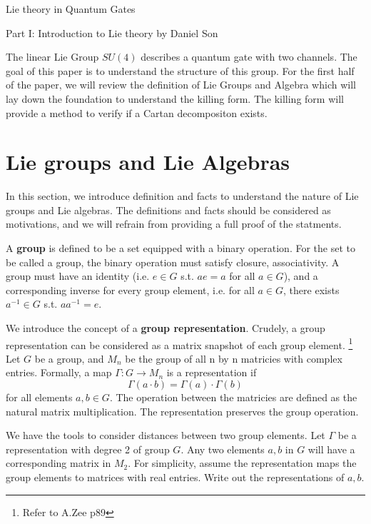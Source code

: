 \documentclass{article}
\begin{document}
\begin{center}
\LARGE
Lie theory in Quantum Gates

\Large
Part I: Introduction to Lie theory by Daniel Son
\end{center}

\normalsize

The linear Lie Group $SU(4)$ describes a quantum gate with two channels. 
The goal of this paper is to understand the structure of this group. 
For the first half of the paper, we will review the definition of Lie Groups 
and Algebra which will lay down the foundation to understand the killing form. 
The killing form will provide a method to verify if a Cartan decompositon 
exists. 

\section{Lie groups and Lie Algebras}


In this section, we introduce definition and facts to 
understand the nature of Lie groups and Lie algebras. 
The definitions and facts should be considered as motivations, 
and we will refrain from providing a full proof of the statments. 


A \textbf{group} is defined to be a set equipped with a binary operation. 
For the set to be called a group, the binary operation must satisfy 
closure, associativity. A group must have an identity (i.e. $e \in G$ s.t. 
$a e = a$ for all $a \in G$), and a corresponding 
inverse for every group element, i.e. for all $a \in G$, there exists $a^{-1} \in G$ s.t. 
$a a^{-1} = e$. 

We introduce the concept of a \textbf{group representation}. 
Crudely, a group representation can be considered as a matrix snapshot 
of each group element. \footnote{Refer to A.Zee p89}
Let $G$ be a group, and $M_n$ be the group of all n by n matricies 
with complex entries. 
Formally, a map $\Gamma: G \rightarrow M_n$ is a representation if 
\[
    \Gamma(a \cdot b) = \Gamma(a) \cdot \Gamma(b)
\]
for all elements $a, b \in G$. The operation between the matricies 
are defined as the natural matrix multiplication. The representation 
preserves the group operation. 

We have the tools to consider distances between two group elements. 
Let $\Gamma$ be a representation with degree 2 of group $G$. Any two elements 
$a, b$ in $G$ will have a corresponding matrix in $M_2$.
For simplicity, assume the representation maps the group 
elements to matrices with real entries. 
Write out 
the representations of $a, b$. 
\end{document}
